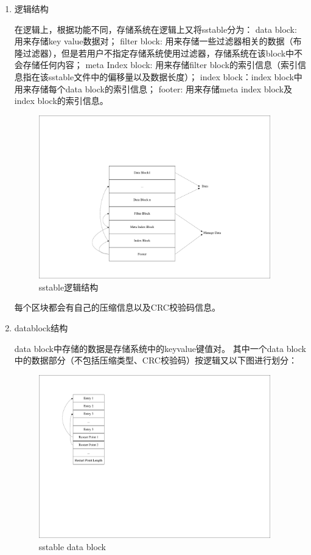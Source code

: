 \begin{enumerate}
\begin{enumerate}
					\item 逻辑结构
	
					在逻辑上，根据功能不同，存储系统在逻辑上又将sstable分为：
	data block: 用来存储key value数据对；
	filter block: 用来存储一些过滤器相关的数据（布隆过滤器），但是若用户不指定存储系统使用过滤器，存储系统在该block中不会存储任何内容；
	meta Index block: 用来存储filter block的索引信息（索引信息指在该sstable文件中的偏移量以及数据长度）；
	index block：index block中用来存储每个data block的索引信息；
	footer: 用来存储meta index block及index block的索引信息。
	
	\begin{figure}[H]
		\centering
		\includegraphics[width=0.95\textwidth]{pdf/sstable_logic.pdf}
		\caption{sstable逻辑结构}
		\label{sstable_logic}
	\end{figure}
	
				每个区块都会有自己的压缩信息以及CRC校验码信息。
	
					\item datablock结构
	
					data block中存储的数据是存储系统中的keyvalue键值对。
					其中一个data block中的数据部分（不包括压缩类型、CRC校验码）按逻辑又以下图进行划分：
					
					\begin{figure}[H]
						\centering
						\includegraphics[width=0.95\textwidth]{pdf/datablock.pdf}
						\caption{sstable data block}
						\label{sstable_data_block}
					\end{figure}
					

\end{enumerate}
\end{enumerate}
